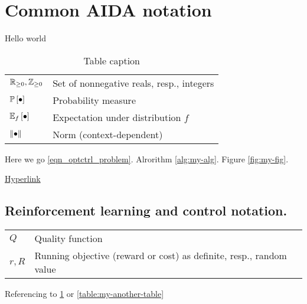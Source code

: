 \documentclass[12pt,twoside]{../../mitthesis}
\begin{document}
\section*{Common AIDA notation}

Hello world
\begin{table}
\caption{Table caption}
\label{table:my-table}
\begin{tabularx}{0.97\textwidth}{ |p{}|p{}| }  
\hline
$\R_{\ge 0}, \Z_{\ge 0}$ & Set of nonnegative reals, resp., integers \\ 
$\PP{\bullet}$ & Probability measure \\
$\E[f]{\bullet}$ & Expectation under distribution $f$ \\
$\nrm{\bullet}$ & Norm (context-dependent) \\
\hline
\end{tabularx}
\end{table}
Here we go \eqref{eqn_optctrl_problem}. Alrorithm \ref{alg:my-alg}. Figure \ref{fig:my-fig}. %

\hyperlink{common-aida-notation}{Hyperlink}

\subsection*{Reinforcement learning and control notation.}
\label{sec:notation}
\begin{tabularx}{0.97\textwidth}{ |p{}|p{}| }  
\hline
$Q$ & Quality function \\ 
$r, R$ & Running objective (reward or cost) as definite, resp., random value\\
\hline
\end{tabularx}


Referencing to \ref{table:my-table} or \ref{table:my-another-table}
\end{document}
